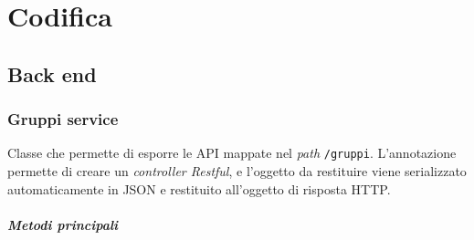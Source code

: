\section{Codifica}
\subsection{Back end}
\subsubsection{Gruppi service}
\label{par:GruppiController}
Classe che permette di esporre le \gls{API} mappate nel \textit{path} \texttt{/gruppi}. 
L'annotazione  permette di creare un \textit{controller Restful}, e l'oggetto da restituire viene serializzato automaticamente in JSON e restituito all'oggetto di risposta HTTP.
\subparagraph*{Metodi principali}
